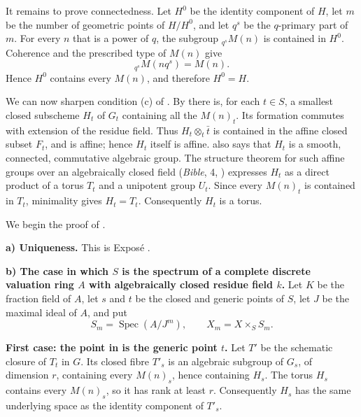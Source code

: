 It remains to prove connectedness. Let \(H^0\) be the identity
component of \(H\), let \(m\) be the number of geometric points of
\(H/H^0\), and let \(q^s\) be the \(q\)-primary part of \(m\). For
every \(n\) that is a power of \(q\), the subgroup
\({}_{q^s}M(n)\) is contained in \(H^0\). Coherence and the prescribed
type of \(M(n)\) give
\[
  {}_{q^s}M(nq^s)=M(n).
\]
Hence \(H^0\) contains every \(M(n)\), and therefore \(H^0=H\).

We can now sharpen condition (c) of . By  there
is, for each \(t\in S\), a smallest closed subscheme \(H_t\) of
\(G_t\) containing all the \(M(n)_t\). Its formation commutes with
extension of the residue field. Thus \(H_t\otimes_t\bar t\) is
contained in the affine closed subset \(F_t\), and is affine; hence
\(H_t\) itself is affine.  also says that \(H_t\) is a
smooth, connected, commutative algebraic group. The structure theorem
for such affine groups over an algebraically closed field
(\emph{Bible}, 4, ) expresses \(H_t\) as a direct product of
a torus \(T_t\) and a unipotent group \(U_t\). Since every \(M(n)_t\)
is contained in \(T_t\), minimality gives \(H_t=T_t\). Consequently
\(H_t\) is a torus.

We begin the proof of .

\medskip\noindent
\textbf{a) Uniqueness.}
This is Exposé .

\medskip\noindent
\textbf{b) The case in which \(S\) is the spectrum of a complete
discrete valuation ring \(A\) with algebraically closed residue field
\(k\).}
Let \(K\) be the fraction field of \(A\), let \(s\) and \(t\) be the
closed and generic points of \(S\), let \(J\) be the maximal ideal of
\(A\), and put
\[
  S_m=\operatorname{Spec}(A/J^m),\qquad X_m=X\times_SS_m.
\]

\smallskip\noindent
\textbf{First case: the point in  is the generic point
\(t\).}
Let \(T'\) be the schematic closure of \(T_t\) in \(G\). Its closed
fibre \(T'_s\) is an algebraic subgroup of \(G_s\), of dimension
\(r\), containing every \(M(n)_s\), hence containing \(H_s\). The
torus \(H_s\) contains every \(M(n)_s\), so it has rank at least
\(r\). Consequently \(H_s\) has the same underlying space as the
identity component of \(T'_s\).

